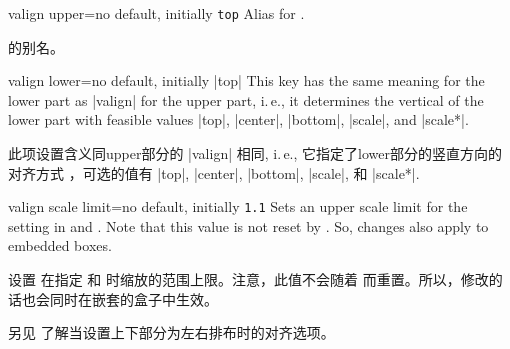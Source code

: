 \begin{docTcbKey}[][doc new=2015-05-07]{valign upper}{=}{no default, initially \texttt{top}}
Alias for .

 的别名。
\end{docTcbKey}

\begin{docTcbKey}{valign lower}{=}{no default, initially |top|}
This key has the same meaning for the lower part as |valign|
for the upper part, i.\,e., it determines
the vertical  of the lower part with feasible values
|top|, |center|, |bottom|, |scale|, and |scale*|.

此项设置含义同upper部分的 |valign| 相同, i.\,e., 它指定了lower部分的竖直方向的对齐方式  ，可选的值有 |top|, |center|, |bottom|, |scale|, 和 |scale*|.

\end{docTcbKey}

\begin{docTcbKey}[][doc new=2015-07-16]{valign scale limit}{=}{no default, initially \texttt{1.1}}
Sets an upper scale limit for the  setting in
 and .
Note that this value is not reset by . So, changes
also apply to embedded boxes.

设置  在指定  和  时缩放的范围上限。注意，此值不会随着  而重置。所以，修改的话也会同时在嵌套的盒子中生效。
\end{docTcbKey}


另见  了解当设置上下部分为左右排布时的对齐选项。